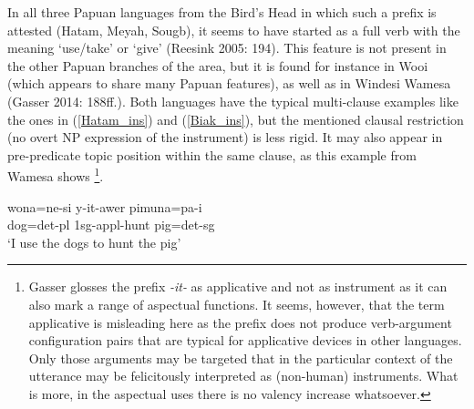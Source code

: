 In all three Papuan languages from the Bird's Head in which such a prefix is attested (Hatam, Meyah, Sougb), it seems to have started as a full verb with the meaning `use/take' or `give' (Reesink 2005: 194). This feature is not present in the other Papuan branches of the area, but it is found for instance in Wooi (which appears to share many Papuan features), as well as in Windesi Wamesa (Gasser 2014: 188ff.). Both languages have the typical multi-clause examples like the ones in (\ref{Hatam_ins}) and (\ref{Biak_ins}), but the mentioned clausal restriction (no overt NP expression of the instrument) is less rigid. It may also appear in pre-predicate topic position within the same clause, as this example from Wamesa shows \footnote{Gasser glosses the prefix \textit{-it-} as applicative and not as instrument as it can also mark a range of aspectual functions. It seems, however, that the term applicative is misleading here as the prefix does not produce verb-argument configuration pairs that are typical for applicative devices in other languages. Only those arguments may be targeted that in the particular context of the utterance may be felicitously interpreted as (non-human) instruments. What is more, in the aspectual uses there is no valency increase whatsoever.}.

\ea 
\gll wona=ne-si y-it-awer pimuna=pa-i \\
dog=\acs{det}-\acs{pl} \acs{1}\acs{sg}-\acs{appl}-hunt pig=\acs{det}-\acs{sg} \\
\glft `I use the dogs to hunt the pig' \\ 
\endgl
\xe

